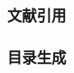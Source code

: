 \subsubsection{文献引用}
\label{Subsubsect_Citations}

\subsubsection{目录生成}
\label{Subsubsect_CreatTOC}
